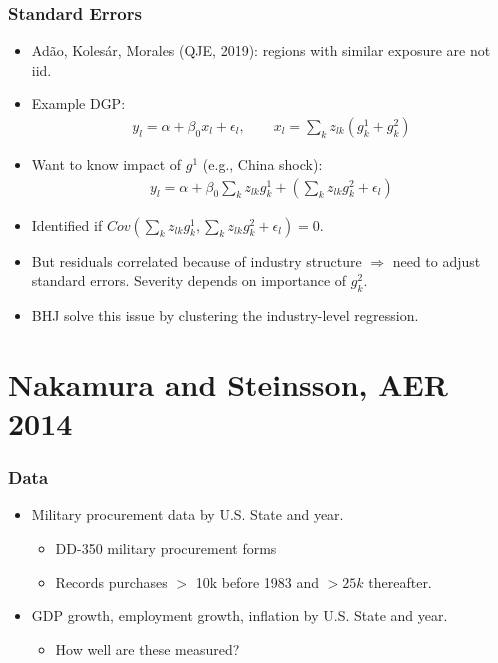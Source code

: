\documentclass[english,xcolor=svgnames]{beamer}
\begin{document}
\begin{frame}
\frametitle[alignment=center]{Standard Errors}
\begin{itemize}
	\item Ad\~{a}o, Koles\'{a}r, Morales (QJE, 2019): regions with similar exposure are not iid.
	\item Example DGP:
	\begin{align*}
		y_l = \alpha+\beta_0 x_l + \epsilon_l ,\qquad x_l = \sum_k z_{lk}(g_k^1 + g_k^2)
	\end{align*}
	\item Want to know impact of $g^1$ (e.g., China shock):
	\begin{align*}
		y_l = \alpha+\beta_0 \sum_k z_{lk}g_k^1 + (\sum_k z_{lk}g_k^2 + \epsilon_l)
	\end{align*}
	\item Identified if $Cov(\sum_k z_{lk}g_k^1,\sum_k z_{lk}g_k^2 + \epsilon_l) = 0$.
	\item But residuals correlated because of industry structure $\Rightarrow$ need to adjust standard errors. Severity depends on importance of $g_k^2$.
	\item BHJ solve this issue by clustering the industry-level regression.
\end{itemize}
\end{frame}





\section{Nakamura and Steinsson, AER 2014}

\begin{frame}
\frametitle[alignment=center]{Data}
\begin{itemize}
	\item Military procurement data by U.S. State and year.
	\begin{itemize}
		\item  DD-350 military procurement forms
		\item Records purchases $>$ 10k before 1983 and $>25k$ thereafter.
	\end{itemize}	
	\item GDP growth, employment growth, inflation by U.S. State and year.
	\begin{itemize}
		\item How well are these measured?
	\end{itemize}
\end{itemize}
\end{frame}
\end{document}
